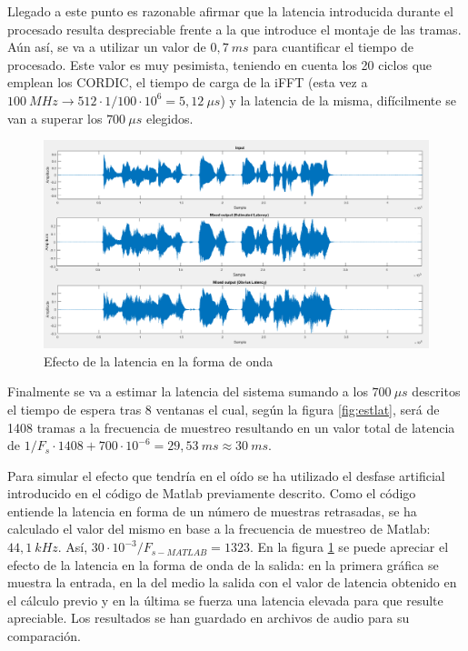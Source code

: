 Llegado a este punto es razonable afirmar que la latencia introducida durante el procesado resulta despreciable frente a la que introduce el montaje de las tramas. Aún así, se va a utilizar un valor de $0,7~ms$ para cuantificar el tiempo de procesado. Este valor es muy pesimista, teniendo en cuenta los 20 ciclos que emplean los CORDIC, el tiempo de carga de la iFFT (esta vez a $100~MHz \rightarrow 512\cdot1/100\cdot10^{6} = 5,12~\mu s$) y la latencia de la misma, difícilmente se van a superar los $700~\mu s$ elegidos.

\begin{figure}[thb]
\begin{center}
\includegraphics[width=14cm]{img/efectolatencia.png}
\caption{\label{fig:efectolatencia}Efecto de la latencia en la forma de onda}
\end{center}
\end{figure}

Finalmente se va a estimar la latencia del sistema sumando a los $700~\mu s$ descritos el tiempo de espera tras 8 ventanas el cual, según la figura \ref{fig:estlat}, será de 1408 tramas a la frecuencia de muestreo resultando en un valor total de latencia de $1/F_{s} \cdot 1408 + 700 \cdot 10^{-6}=29,53~ms \approx 30~ms$. 

Para simular el efecto que tendría en el oído se ha utilizado el desfase artificial introducido en el código de Matlab previamente descrito. Como el código entiende la latencia en forma de un número de muestras retrasadas, se ha calculado el valor del mismo en base a la frecuencia de muestreo de Matlab: $44,1~kHz$. Así, $30 \cdot 10^{-3}/F_{s-MATLAB}=1323$. En la figura \ref{fig:efectolatencia} se puede apreciar el efecto de la latencia en la forma de onda de la salida: en la primera gráfica se muestra la entrada, en la del medio la salida con el valor de latencia obtenido en el cálculo previo y en la última se fuerza una latencia elevada para que resulte apreciable. Los resultados se han guardado en archivos de audio para su comparación.

